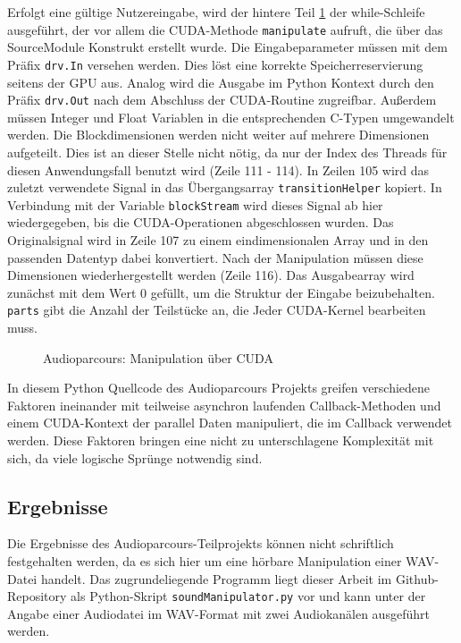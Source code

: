 Erfolgt eine gültige Nutzereingabe, wird der hintere Teil \ref{fig:audioparkour_cuda+arrayShaping} der while-Schleife ausgeführt, der vor allem die CUDA-Methode \texttt{manipulate} aufruft, die über das SourceModule Konstrukt erstellt wurde. Die Eingabeparameter müssen mit dem Präfix \texttt{drv.In} versehen werden. Dies löst eine korrekte Speicherreservierung seitens der GPU aus. Analog wird die Ausgabe im Python Kontext durch den Präfix \texttt{drv.Out} nach dem Abschluss der CUDA-Routine zugreifbar. Außerdem müssen Integer und Float Variablen in die entsprechenden C-Typen umgewandelt werden. Die Blockdimensionen werden nicht weiter auf mehrere Dimensionen aufgeteilt. Dies ist an dieser Stelle nicht nötig, da nur der Index des Threads für diesen Anwendungsfall benutzt wird (Zeile 111 - 114). In Zeilen 105 wird das zuletzt verwendete Signal in das Übergangsarray \texttt{transitionHelper} kopiert. In Verbindung mit der Variable \texttt{blockStream} wird dieses Signal ab hier wiedergegeben, bis die CUDA-Operationen abgeschlossen wurden. Das Originalsignal wird in Zeile 107 zu einem eindimensionalen Array und in den passenden Datentyp dabei konvertiert. Nach der Manipulation müssen diese Dimensionen wiederhergestellt werden (Zeile 116). Das Ausgabearray wird zunächst mit dem Wert 0 gefüllt, um die Struktur der Eingabe beizubehalten. \texttt{parts} gibt die Anzahl der Teilstücke an, die Jeder CUDA-Kernel bearbeiten muss. 

\begin{figure}[h!]
	
	
	
	\caption{Audioparcours: Manipulation über CUDA}
	\label{fig:audioparkour_cuda+arrayShaping}
\end{figure}

In diesem Python Quellcode des Audioparcours Projekts greifen verschiedene Faktoren ineinander mit teilweise asynchron laufenden Callback-Methoden und einem CUDA-Kontext der parallel Daten manipuliert, die im Callback verwendet werden. Diese Faktoren bringen eine nicht zu unterschlagene Komplexität mit sich, da viele logische Sprünge notwendig sind.

\subsection{Ergebnisse}

Die Ergebnisse des Audioparcours-Teilprojekts können nicht schriftlich festgehalten werden, da es sich hier um eine hörbare Manipulation einer WAV-Datei handelt. Das zugrundeliegende Programm liegt dieser Arbeit im Github-Repository \cite{fahaba_github} als Python-Skript \texttt{soundManipulator.py} vor und kann unter der Angabe einer Audiodatei im WAV-Format mit zwei Audiokanälen ausgeführt werden.